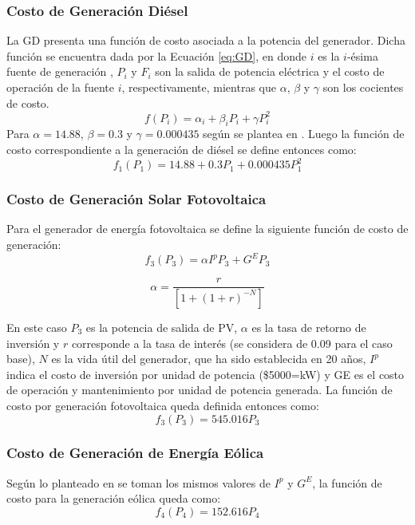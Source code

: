 \subsubsection{Costo de Generación Diésel}
La GD presenta una función de costo asociada a la potencia del generador. Dicha función se encuentra dada por la Ecuación \ref{eq:GD}, en donde $i$ es la $i$-ésima fuente de generación , $P_i$ y $F_i$ son la salida de potencia eléctrica y el costo de operación de la fuente $i$, respectivamente, mientras que $\alpha$, $\beta$  y $\gamma$ son los cocientes de costo.
 \begin{equation}\label{eq:GD}
   f(P_i)=\alpha_i +\beta_iP_i +\gamma P^2_i
 \end{equation}
Para  $\alpha=14.88$, $\beta=0.3$  y $\gamma=0.000435$ según se plantea en \cite{zapata_zapata_control_2017}. Luego la función de costo correspondiente a la generación de diésel se define entonces como:
 \begin{equation}\label{eq:GD1}
   f_1(P_1)=14.88 +0.3P_1 +0.000435 P^2_1
 \end{equation}

\subsubsection{Costo de Generación Solar Fotovoltaica}
Para el generador de energía fotovoltaica se define la siguiente función de costo de generación:
\begin{equation}\label{eq:PV1}
   f_3(P_3)=\alpha I^p P_3 +G^EP_3 
 \end{equation}
 
 \begin{equation}\label{eq:PV2}
  \alpha = \frac{r}{\left[1+(1+r)^{-N}\right]}
 \end{equation}

En este caso $P_3$ es la potencia de salida de PV, $\alpha$ es la tasa de retorno de inversión y $r$ corresponde a la tasa de interés (se considera de 0.09 para el caso base), $N$ es la vida útil del generador, que ha sido establecida
en 20 años, $I^p$ indica el costo de inversión por unidad de potencia (\$5000=kW) y GE es el costo de operación y mantenimiento por unidad de potencia generada. La función de costo por generación fotovoltaica queda definida entonces como:
\begin{equation}\label{eq:PV3}
   f_3(P_3)=545.016P_3 
\end{equation}
\subsubsection{Costo de Generación de Energía Eólica}
Según lo planteado en \cite{zapata_zapata_control_2017} se toman los mismos
valores de $I^p$ y $G^E$, la función de costo para la generación eólica queda como:
\begin{equation}\label{eq:GE}
f_4(P_4) = 152.616P_4
\end{equation}
